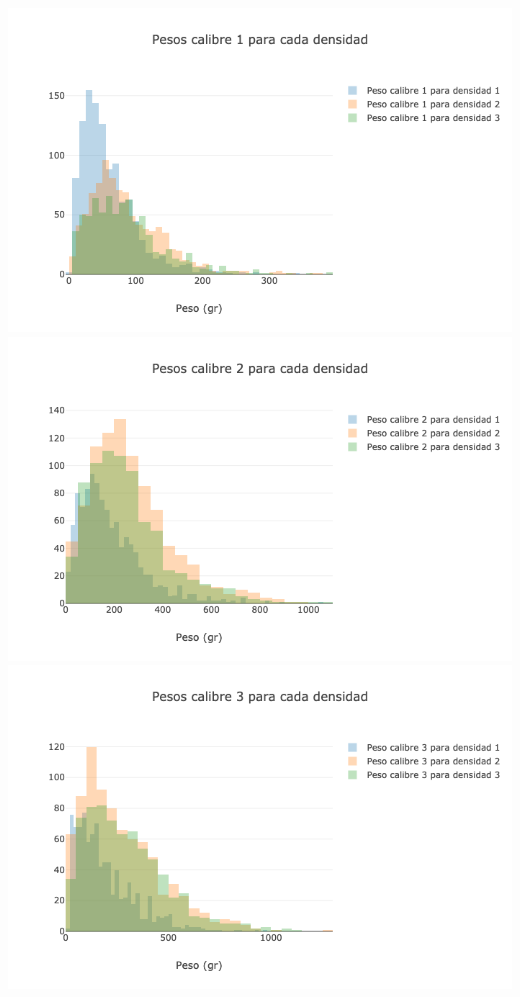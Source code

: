\begin{center}
\includegraphics[scale=0.6]{PD1.png} \\
\includegraphics[scale=0.6]{PD2.png} \\
\includegraphics[scale=0.6]{PD3.png} \\

\end{center}

